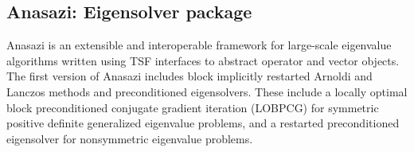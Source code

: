 \documentclass[acmtoms,acmnow]{acmtrans2m}
\begin{document}

\subsection{Anasazi: Eigensolver package}

Anasazi is an extensible and interoperable framework for 
large-scale eigenvalue algorithms written using TSF interfaces to
abstract operator and vector objects.  
%
%
The first version of  
Anasazi includes block implicitly restarted Arnoldi and Lanczos methods 
and preconditioned eigensolvers.
These include a locally optimal block preconditioned conjugate 
gradient iteration  (LOBPCG) for symmetric positive definite 
generalized eigenvalue problems, and a 
restarted preconditioned eigensolver for nonsymmetric eigenvalue problems.
\end{document}
